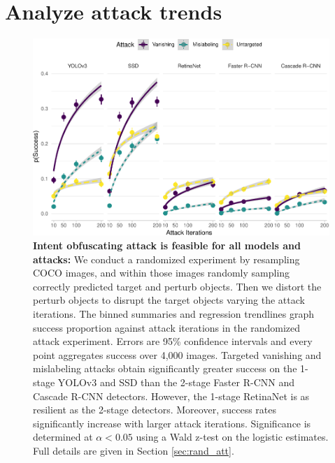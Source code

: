 \section{Analyze attack trends}\label{analyze-attack-trends}

\begin{figure}[tb]

{\centering \includegraphics[width=1\linewidth]{imgs/success_trend_graph} 

}

\caption{\textbf{Intent obfuscating attack is feasible for all models and attacks:}  We conduct a randomized experiment by resampling COCO images, and within those images randomly sampling correctly predicted target and perturb objects. Then we distort the perturb objects to disrupt the target objects varying the attack iterations. The binned summaries and regression trendlines graph success proportion against attack iterations in the randomized attack experiment. Errors are 95\% confidence intervals and every point aggregates success over 4,000 images. Targeted vanishing and mislabeling attacks obtain significantly greater success on the 1-stage YOLOv3 and SSD than the 2-stage Faster R-CNN and Cascade R-CNN detectors. However, the 1-stage RetinaNet is as resilient as the 2-stage detectors. Moreover, success rates significantly increase with larger attack iterations. Significance is determined at $\alpha < 0.05$ using a Wald z-test on the logistic estimates. Full details are given in Section \ref{sec:rand_att}.}\label{fig:success_trend_graph}
\end{figure}

\begingroup\fontsize{9}{11}\selectfont

